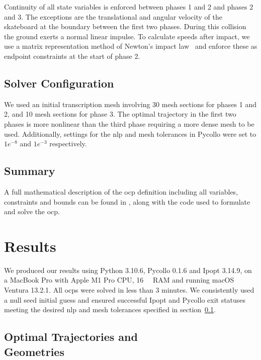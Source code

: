 \documentclass[default,iicol]{sn-jnl}
\begin{document}
Continuity of all state variables is enforced between phases 1 and 2 and phases 2 and 3. The exceptions are the translational and angular velocity of the skateboard at the boundary between the first two phases. During this collision the ground exerts a normal linear impulse. To calculate speeds after impact, we use a matrix representation method of Newton's impact law~\cite{vallery_heike_advanced_2018} and enforce these as endpoint constraints at the start of phase 2.


\subsection{Solver Configuration}\label{s_settings}
We used an initial transcription mesh involving 30 mesh sections for phases 1 and 2, and 10 mesh sections for phase 3. The optimal trajectory in the first two phases is more nonlinear than the third phase requiring a more dense mesh to be used.
Additionally, settings for the \gls{nlp} and mesh tolerances in Pycollo were set to $1e^{-8}$ and $1e^{-3}$ respectively.

\subsection{Summary}\label{s_summary}
A full mathematical description of the \gls{ocp} definition including all variables, constraints and bounds can be found in \cite{heinen_optimal_2022}, along with the code used to formulate and solve the \gls{ocp}.


\section{Results}

We produced our results using Python 3.10.6, Pycollo 0.1.6 and Ipopt 3.14.9, on a MacBook Pro with Apple M1 Pro CPU, \SI{16}{\giga\byte} RAM and running macOS Ventura 13.2.1.
All \glspl{ocp} were solved in less than 3 minutes.
We consistently used a null seed initial guess and ensured successful Ipopt and Pycollo exit statuses meeting the desired \gls{nlp} and mesh tolerances specified in section~\ref{s_settings}.

\subsection{Optimal Trajectories and \\Geometries}
\end{document}
